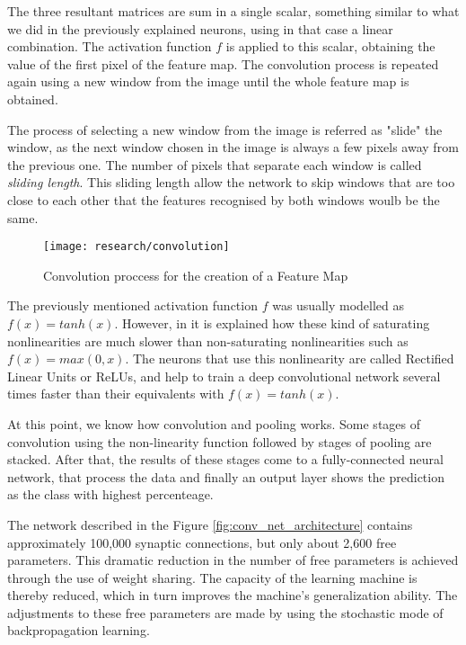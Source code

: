 The three resultant matrices are sum in a single scalar, something similar to what we did in the previously explained neurons, using in that case a linear combination. The activation function $f$ is applied to this scalar, obtaining the value of the first pixel of the feature map. The convolution process is repeated again using a new window from the image until the whole feature map is obtained. 

The process of selecting a new window from the image is referred as "slide" the window, as the next window chosen in the image is always a few pixels away from the previous one. The number of pixels that separate each window is called \textit{sliding length}. This sliding length allow the network to skip windows that are too close to each other that the features recognised by both windows woulb be the same.

\begin{figure}[!ht]
	\centering
	\texttt{[image: research/convolution]}
	\caption{Convolution proccess for the creation of a Feature Map}
	\label{fig:convol_creation_feature_map}
\end{figure}

The previously mentioned activation function $f$ was usually modelled as $f(x)=tanh(x)$. However, in \cite{krizhevsky2012deep} it is explained how these kind of saturating nonlinearities are much slower than non-saturating nonlinearities such as $f(x)=max(0, x)$. The neurons that use this nonlinearity are called Rectified Linear Units or ReLUs, and help to train a deep convolutional network several times faster than their equivalents with $f(x)=tanh(x)$.

At this point, we know how convolution and pooling works. Some stages of convolution using the non-linearity function followed by stages of pooling are stacked. After that, the results of these stages come to a fully-connected neural network, that process the data and finally an output layer shows the prediction as the class with highest percenteage.

The network described in the Figure \ref{fig:conv_net_architecture} contains approximately 100,000 synaptic connections, but only about 2,600 free parameters. This dramatic reduction in the number of free parameters is achieved through the use of weight sharing. The capacity of the learning machine is thereby reduced, which in turn improves the machine’s generalization ability. The adjustments to these free parameters are made by using the stochastic mode of backpropagation learning.



